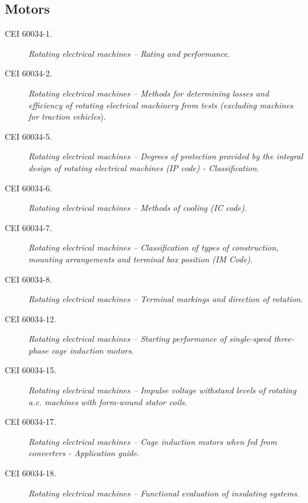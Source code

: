 \subsection*{Motors}
\begin{description}
    \item [\hspace{5mm}CEI 60034-1.] \textit{Rotating electrical machines -- Rating and performance}.
    \item [\hspace{5mm}CEI 60034-2.] \textit{Rotating electrical machines -- Methods for determining losses and
efficiency of rotating electrical machinery from tests (excluding machines for traction vehicles}).
    \item [\hspace{5mm}CEI 60034-5.] \textit{Rotating electrical machines -- Degrees of protection provided by the
integral design of rotating electrical machines (IP code) - Classification}.
    \item [\hspace{5mm}CEI 60034-6.] \textit{Rotating electrical machines -- Methods of cooling (IC code)}.
    \item [\hspace{5mm}CEI 60034-7.] \textit{Rotating electrical machines -- Classification of types of construction, mounting arrangements and terminal box position (IM Code)}.
    \item [\hspace{5mm}CEI 60034-8.] \textit{Rotating electrical machines -- Terminal markings and direction of
rotation}.
    \item [\hspace{5mm}CEI 60034-12.] \textit{Rotating electrical machines -- Starting performance of single-speed
three-phase cage induction motors}.
    \item [\hspace{5mm}CEI 60034-15.] \textit{Rotating electrical machines -- Impulse voltage withstand levels of
rotating a.c. machines with form-wound stator coils}.
    \item [\hspace{5mm}CEI 60034-17.] \textit{Rotating electrical machines -- Cage induction motors when fed from
converters - Application guide}.
    \item [\hspace{5mm}CEI 60034-18.] \textit{Rotating electrical machines -- Functional evaluation of insulating
systems}.
\end{description}

